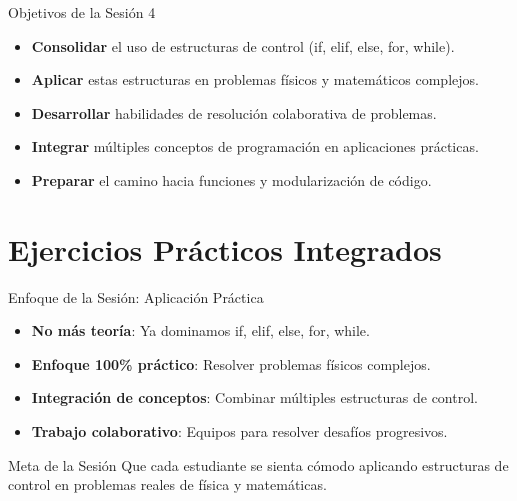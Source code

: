 \documentclass[10pt]{beamer}
\begin{document}
\begin{frame}{Objetivos de la Sesión 4}
  \begin{itemize}
    \item \textbf{Consolidar} el uso de estructuras de control (if, elif, else, for, while).
    \item \textbf{Aplicar} estas estructuras en problemas físicos y matemáticos complejos.
    \item \textbf{Desarrollar} habilidades de resolución colaborativa de problemas.
    \item \textbf{Integrar} múltiples conceptos de programación en aplicaciones prácticas.
    \item \textbf{Preparar} el camino hacia funciones y modularización de código.
  \end{itemize}
\end{frame}

\section{Ejercicios Prácticos Integrados}

\begin{frame}{Enfoque de la Sesión: Aplicación Práctica}
  \begin{itemize}
    \item \textbf{No más teoría}: Ya dominamos if, elif, else, for, while.
    \item \textbf{Enfoque 100\% práctico}: Resolver problemas físicos complejos.
    \item \textbf{Integración de conceptos}: Combinar múltiples estructuras de control.
    \item \textbf{Trabajo colaborativo}: Equipos para resolver desafíos progresivos.
  \end{itemize}
  
  \begin{block}{Meta de la Sesión}
    Que cada estudiante se sienta cómodo aplicando estructuras de control en problemas reales de física y matemáticas.
  \end{block}
\end{frame}
\end{document}
